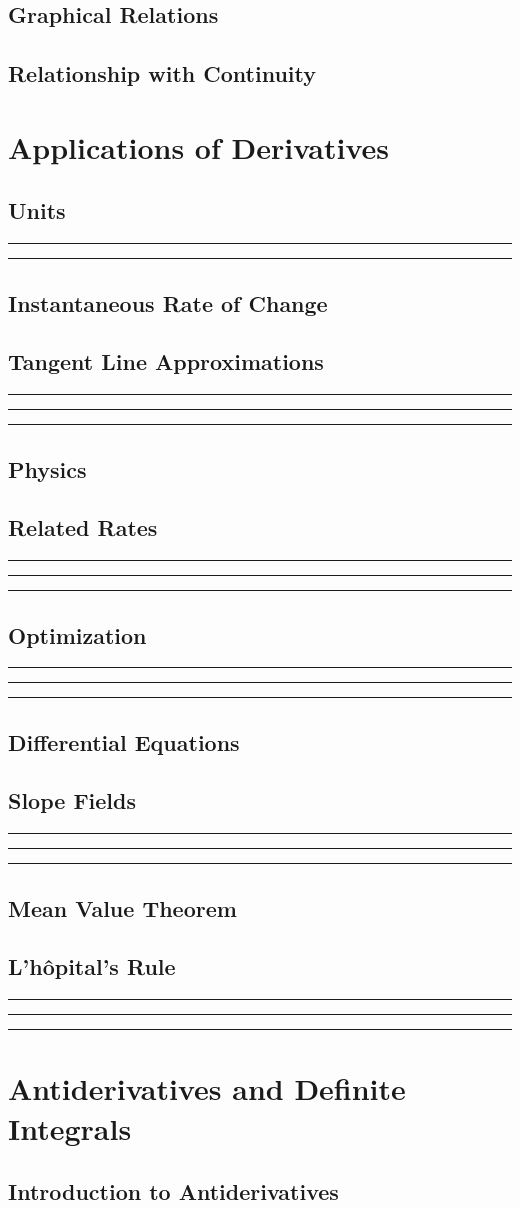 \documentclass{article}
\newcommand{\newMidline}{\noindent\rule[0.5ex]{\linewidth}{1pt}}
\newcommand{\newchapter}[2]
{
	\subsection{#1}\newMidline\newMidline\newMidline\vspace{.125in}
}
\begin{document}
\subsection{Graphical Relations} 
\subsection{Relationship with Continuity} 
\newpage
\section{Applications of Derivatives}
\subsection{Units}\newMidline\newMidline
\subsection{Instantaneous Rate of Change}
\newchapter{Tangent Line Approximations}{TangentLineApproximations}
\subsection{Physics}
\newchapter{Related Rates}{DerivativeRelatedRates}
\newchapter{Optimization}{Optimization}
\subsection{Differential Equations}
\newchapter{Slope Fields}{SlopeFields}
\subsection{Mean Value Theorem}
\newchapter{L'h\^{o}pital's Rule}{LhospitalsRule}
\newpage
\section{Antiderivatives and Definite Integrals}
\subsection{Introduction to Antiderivatives}
\end{document}
